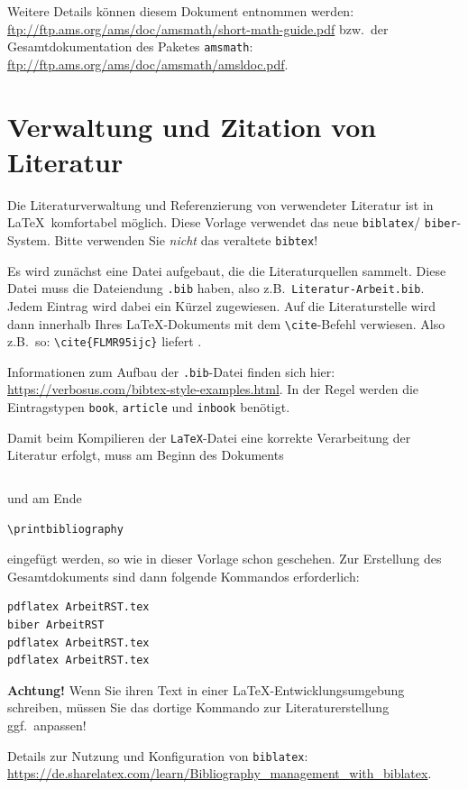 \documentclass[arbeit=master,oneside,BCOR=12mm]{ArbeitRST}
\begin{document}
Weitere Details können diesem Dokument entnommen werden: \url{ftp://ftp.ams.org/ams/doc/amsmath/short-math-guide.pdf} bzw.~der Gesamtdokumentation des Paketes \texttt{amsmath}: \url{ftp://ftp.ams.org/ams/doc/amsmath/amsldoc.pdf}.


\chapter{Verwaltung und Zitation von Literatur}
Die Literaturverwaltung und Referenzierung von verwendeter Literatur ist in \LaTeX~komfortabel möglich. Diese Vorlage verwendet das neue \texttt{biblatex}/ \texttt{biber}-System. Bitte verwenden Sie \emph{nicht} das veraltete \texttt{bibtex}!

Es wird zunächst eine Datei aufgebaut, die die Literaturquellen sammelt. Diese Datei muss die Dateiendung \texttt{.bib} haben, also z.B.~\texttt{Literatur-Arbeit.bib}. Jedem Eintrag wird dabei ein Kürzel zugewiesen. Auf die Literaturstelle wird dann innerhalb Ihres \LaTeX-Dokuments mit dem \texttt{\textbackslash cite}-Befehl verwiesen. Also z.B.~so: \texttt{\textbackslash cite\{FLMR95ijc\}} liefert \cite{FLMR95ijc}.

Informationen zum Aufbau der \texttt{.bib}-Datei finden sich hier: \url{https://verbosus.com/bibtex-style-examples.html}. In der Regel werden die Eintragstypen \texttt{book}, \texttt{article} und \texttt{inbook} benötigt.

Damit beim Kompilieren der \texttt{LaTeX}-Datei eine korrekte Verarbeitung der Literatur erfolgt, muss am Beginn des Dokuments
\begin{verbatim}

\end{verbatim}
und am Ende
\begin{verbatim}
\printbibliography
\end{verbatim}
eingefügt werden, so wie in dieser Vorlage schon geschehen. Zur Erstellung des Gesamtdokuments sind dann folgende Kommandos erforderlich:
\begin{verbatim}
pdflatex ArbeitRST.tex
biber ArbeitRST
pdflatex ArbeitRST.tex
pdflatex ArbeitRST.tex
\end{verbatim}

\textbf{Achtung!} Wenn Sie ihren Text in einer \LaTeX -Entwicklungsumgebung schreiben, müssen Sie das dortige Kommando zur Literaturerstellung ggf.~anpassen!

Details zur Nutzung und Konfiguration von \texttt{biblatex}: \url{https://de.sharelatex.com/learn/Bibliography_management_with_biblatex}.
\end{document}
